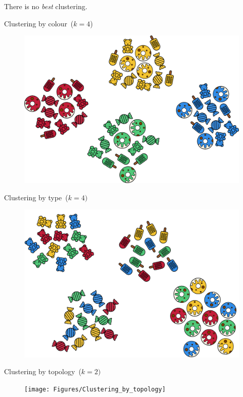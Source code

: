 \documentclass[aspectratio=169]{beamer}
\begin{document}
  \begin{frame}{}
    \begin{center}
      \begin{huge}
        There is no \emph{best} clustering.
      \end{huge}
    \end{center}
  \end{frame}

  \begin{frame}{Clustering by colour~($k = 4$)}
    \begin{figure}
      \includegraphics[width=0.75\linewidth]{Figures/Clustering_by_colour}
    \end{figure}
  \end{frame}

  \begin{frame}{Clustering by type~($k = 4)$}
    \begin{figure}
      \includegraphics[width=0.75\linewidth]{Figures/Clustering_by_type}
    \end{figure}
  \end{frame}

  \begin{frame}{Clustering by topology~($k = 2)$}
    \begin{figure}
      \texttt{[image: Figures/Clustering\_by\_topology]}
    \end{figure}
  \end{frame}
\end{document}
